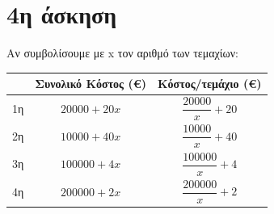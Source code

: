 \documentclass[a4paper]{article}
\begin{document}
\section*{4η άσκηση}

Αν συμβολίσουμε με x τον αριθμό των τεμαχίων:


\begin{center}
	\def\arraystretch{2.75}
	\begin{tabular}{|c|c|c|}
		\hline
		\text{Τεχνολογία} & Συνολικό Κόστος (\euro) & Κόστος/τεμάχιο (\euro) \\
		\hline 
		1η & $ 20000+20x $ & $ \dfrac{20000}{x}+20 $\\
		\hline 
		2η & $ 10000+40x $ & $ \dfrac{10000}{x}+40 $\\
		\hline
		3η & $ 100000+4x $ & $ \dfrac{100000}{x}+4 $\\
		\hline
		4η & $ 200000+2x $ & $ \dfrac{200000}{x}+2 $\\
		\hline
	\end{tabular}
\end{center}
\end{document}
